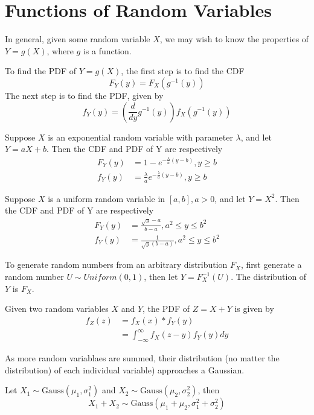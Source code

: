 \section{Functions of Random Variables}

In general, given some random variable
$X$, we may wish to know the properties
of $Y = g(X)$, where $g$ is a function.

To find the PDF of $Y = g(X)$, the first
step is to find the CDF
\begin{equation}
    F_Y(y) = F_X(g^{-1}(y))
\end{equation}
The next step is to find the PDF, given by
\begin{equation}
    f_Y(y) = \left(\frac{d}{dy}g^{-1}(y)\right)f_X(g^{-1}(y))
\end{equation}

Suppose $X$ is an exponential random variable
with parameter $\lambda$, and let $Y  = aX + b$.
Then the CDF and PDF of Y are respectively
\begin{align}
    F_Y(y) & = 1 - e^{-\frac{\lambda}{a}(y - b)}, y \geq b              \\
    f_Y(y) & = \frac{\lambda}{a}e^{-\frac{\lambda}{a}(y - b)}, y \geq b
\end{align}

Suppose $X$ is a uniform random variable in $\left[a, b\right], a > 0$,
and let $Y = X^2$. Then the CDF and PDF of Y are respectively
\begin{align}
    F_Y(y) & = \frac{\sqrt{y} - a}{b - a}, a^2 \leq y \leq b^2 \\
    f_Y(y) & = \frac{1}{\sqrt{y}(b - a)}, a^2 \leq y \leq b^2
\end{align}

To generate random numbers from an arbitrary
distribution $F_X$, first generate a random
number $U \sim Uniform(0,1)$, then let
$Y = F^{-1}_X(U)$. The distribution of $Y$ is
$F_X$.

Given two random variables $X$ and $Y$, the
PDF of $Z = X + Y$ is given by
\begin{align}
    f_Z(z) & = f_X(x) * f_Y(y)                          \\
           & = \int_{-\infty}^{\infty} f_X(z-y)f_Y(y)dy
\end{align}

As more random variablaes are summed, their
distribution (no matter the distribution) of each
individual variable) approaches a Gaussian.

Let $X_1 \sim \text{Gauss}(\mu_1, \sigma_1^2)$ and
$X_2 \sim \text{Gauss}(\mu_2, \sigma_2^2)$, then
\begin{equation}
    X_1 + X_2 \sim \text{Gauss}\left( \mu_1 + \mu_2, \sigma_1^2 + \sigma_2^2 \right)
\end{equation}